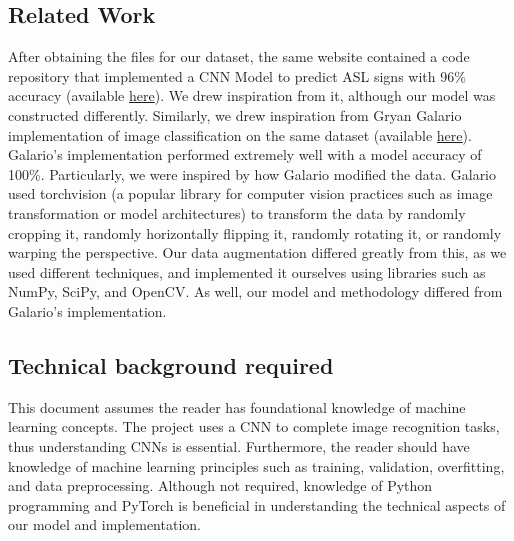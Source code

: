 \documentclass[10pt,twocolumn,letterpaper]{article}
\begin{document}
\subsection{Related Work}
After obtaining the files for our dataset, the same website contained a code repository that 
implemented a CNN Model to predict ASL signs with 96\% accuracy (available
\href{https://www.kaggle.com/code/reemasolan/ml-asl-alphabet-cnn-model-96-accuracy}{here}). We drew inspiration
from it, although our model was constructed differently. Similarly, we drew inspiration from Gryan Galario 
implementation of image classification
on the same dataset (available 
\href{https://medium.com/@gryangalario/image-classification-on-the-american-sign-language-alphabet-dataset-45da66f8871e}{here}).
Galario’s implementation performed extremely well with a model accuracy of 100\%.
Particularly, we were inspired by how Galario modified the data. Galario used torchvision
(a popular library for computer vision practices such as image transformation or model architectures)
to transform the data by randomly cropping it, randomly horizontally flipping it,
randomly rotating it, or randomly warping the perspective. Our data augmentation
differed greatly from this, as we used different techniques, and implemented it
ourselves using libraries such as NumPy, SciPy, and OpenCV. As well, our model
and methodology differed from Galario’s implementation.


\subsection{Technical background required}

This document assumes the reader has foundational knowledge of machine learning concepts.
The project uses a CNN to complete image recognition tasks, thus understanding CNNs is essential.
Furthermore, the reader should have knowledge of machine learning principles such as training, validation, overfitting,
and data preprocessing. Although not required, knowledge of Python programming and PyTorch is beneficial in understanding
the technical aspects of our model and implementation. 



\end{document}
